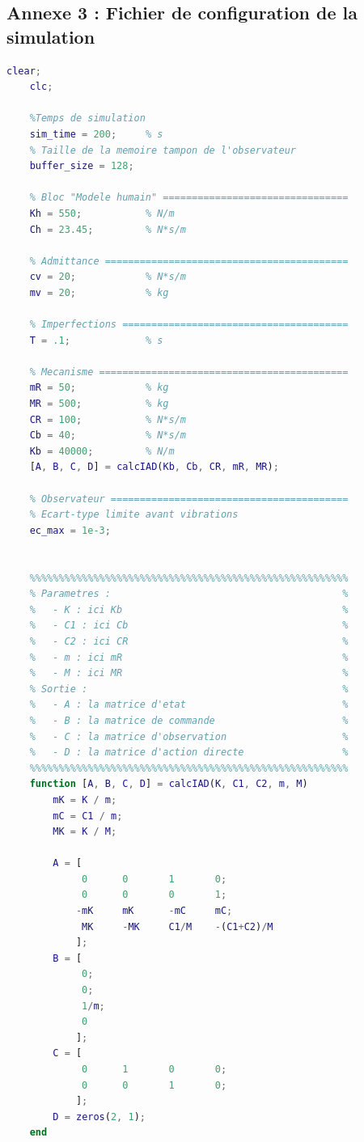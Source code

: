 \documentclass[a4paper,12pt]{article}
\begin{document}
    \subsection{Annexe 3 : Fichier de configuration de la simulation} \label{Annexe:configSimu}
    \begin{lstlisting}[caption={Fonction simulink de calcul du compensateur}, language=Matlab]
    clear;
    clc;

    %Temps de simulation
    sim_time = 200;     % s
    % Taille de la memoire tampon de l'observateur
    buffer_size = 128;

    % Bloc "Modele humain" ================================
    Kh = 550;           % N/m
    Ch = 23.45;         % N*s/m
    
    % Admittance ==========================================
    cv = 20;            % N*s/m
    mv = 20;            % kg
    
    % Imperfections =======================================
    T = .1;             % s

    % Mecanisme ===========================================
    mR = 50;            % kg
    MR = 500;           % kg
    CR = 100;           % N*s/m
    Cb = 40;            % N*s/m
    Kb = 40000;         % N/m
    [A, B, C, D] = calcIAD(Kb, Cb, CR, mR, MR);

    % Observateur =========================================
    % Ecart-type limite avant vibrations
    ec_max = 1e-3;

    
    %%%%%%%%%%%%%%%%%%%%%%%%%%%%%%%%%%%%%%%%%%%%%%%%%%%%%%%
    % Parametres :                                        %
    %   - K : ici Kb                                      %
    %   - C1 : ici Cb                                     %
    %   - C2 : ici CR                                     %
    %   - m : ici mR                                      %
    %   - M : ici MR                                      %
    % Sortie :                                            %
    %   - A : la matrice d'etat                           %
    %   - B : la matrice de commande                      %
    %   - C : la matrice d'observation                    %
    %   - D : la matrice d'action directe                 %
    %%%%%%%%%%%%%%%%%%%%%%%%%%%%%%%%%%%%%%%%%%%%%%%%%%%%%%%
    function [A, B, C, D] = calcIAD(K, C1, C2, m, M)
        mK = K / m;
        mC = C1 / m;
        MK = K / M;
    
        A = [
             0      0       1       0;
             0      0       0       1;
            -mK     mK      -mC     mC;
             MK     -MK     C1/M    -(C1+C2)/M
            ];
        B = [
             0;
             0;
             1/m;
             0
            ];
        C = [
             0      1       0       0;
             0      0       1       0;
            ];
        D = zeros(2, 1);
    end
    \end{lstlisting}
\end{document}
